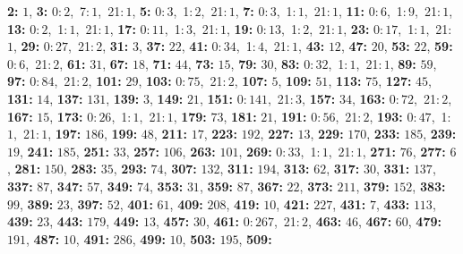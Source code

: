 \textsf{\bfseries 2:} $1$, \textsf{\bfseries 3:} 0:\,$2$,\ 7:\,$1$,\ 21:\,$1$, \textsf{\bfseries 5:} 0:\,$3$,\ 1:\,$2$,\ 21:\,$1$, \textsf{\bfseries 7:} 0:\,$3$,\ 1:\,$1$,\ 21:\,$1$, \textsf{\bfseries 11:} 0:\,$6$,\ 1:\,$9$,\ 21:\,$1$, \textsf{\bfseries 13:} 0:\,$2$,\ 1:\,$1$,\ 21:\,$1$, \textsf{\bfseries 17:} 0:\,$11$,\ 1:\,$3$,\ 21:\,$1$, \textsf{\bfseries 19:} 0:\,$13$,\ 1:\,$2$,\ 21:\,$1$, \textsf{\bfseries 23:} 0:\,$17$,\ 1:\,$1$,\ 21:\,$1$, \textsf{\bfseries 29:} 0:\,$27$,\ 21:\,$2$, \textsf{\bfseries 31:} $3$, \textsf{\bfseries 37:} $22$, \textsf{\bfseries 41:} 0:\,$34$,\ 1:\,$4$,\ 21:\,$1$, \textsf{\bfseries 43:} $12$, \textsf{\bfseries 47:} $20$, \textsf{\bfseries 53:} $22$, \textsf{\bfseries 59:} 0:\,$6$,\ 21:\,$2$, \textsf{\bfseries 61:} $31$, \textsf{\bfseries 67:} $18$, \textsf{\bfseries 71:} $44$, \textsf{\bfseries 73:} $15$, \textsf{\bfseries 79:} $30$, \textsf{\bfseries 83:} 0:\,$32$,\ 1:\,$1$,\ 21:\,$1$, \textsf{\bfseries 89:} $59$, \textsf{\bfseries 97:} 0:\,$84$,\ 21:\,$2$, \textsf{\bfseries 101:} $29$, \textsf{\bfseries 103:} 0:\,$75$,\ 21:\,$2$, \textsf{\bfseries 107:} $5$, \textsf{\bfseries 109:} $51$, \textsf{\bfseries 113:} $75$, \textsf{\bfseries 127:} $45$, \textsf{\bfseries 131:} $14$, \textsf{\bfseries 137:} $131$, \textsf{\bfseries 139:} $3$, \textsf{\bfseries 149:} $21$, \textsf{\bfseries 151:} 0:\,$141$,\ 21:\,$3$, \textsf{\bfseries 157:} $34$, \textsf{\bfseries 163:} 0:\,$72$,\ 21:\,$2$, \textsf{\bfseries 167:} $15$, \textsf{\bfseries 173:} 0:\,$26$,\ 1:\,$1$,\ 21:\,$1$, \textsf{\bfseries 179:} $73$, \textsf{\bfseries 181:} $21$, \textsf{\bfseries 191:} 0:\,$56$,\ 21:\,$2$, \textsf{\bfseries 193:} 0:\,$47$,\ 1:\,$1$,\ 21:\,$1$, \textsf{\bfseries 197:} $186$, \textsf{\bfseries 199:} $48$, \textsf{\bfseries 211:} $17$, \textsf{\bfseries 223:} $192$, \textsf{\bfseries 227:} $13$, \textsf{\bfseries 229:} $170$, \textsf{\bfseries 233:} $185$, \textsf{\bfseries 239:} $19$, \textsf{\bfseries 241:} $185$, \textsf{\bfseries 251:} $33$, \textsf{\bfseries 257:} $106$, \textsf{\bfseries 263:} $101$, \textsf{\bfseries 269:} 0:\,$33$,\ 1:\,$1$,\ 21:\,$1$, \textsf{\bfseries 271:} $76$, \textsf{\bfseries 277:} $6$, \textsf{\bfseries 281:} $150$, \textsf{\bfseries 283:} $35$, \textsf{\bfseries 293:} $74$, \textsf{\bfseries 307:} $132$, \textsf{\bfseries 311:} $194$, \textsf{\bfseries 313:} $62$, \textsf{\bfseries 317:} $30$, \textsf{\bfseries 331:} $137$, \textsf{\bfseries 337:} $87$, \textsf{\bfseries 347:} $57$, \textsf{\bfseries 349:} $74$, \textsf{\bfseries 353:} $31$, \textsf{\bfseries 359:} $87$, \textsf{\bfseries 367:} $22$, \textsf{\bfseries 373:} $211$, \textsf{\bfseries 379:} $152$, \textsf{\bfseries 383:} $99$, \textsf{\bfseries 389:} $23$, \textsf{\bfseries 397:} $52$, \textsf{\bfseries 401:} $61$, \textsf{\bfseries 409:} $208$, \textsf{\bfseries 419:} $10$, \textsf{\bfseries 421:} $227$, \textsf{\bfseries 431:} $7$, \textsf{\bfseries 433:} $113$, \textsf{\bfseries 439:} $23$, \textsf{\bfseries 443:} $179$, \textsf{\bfseries 449:} $13$, \textsf{\bfseries 457:} $30$, \textsf{\bfseries 461:} 0:\,$267$,\ 21:\,$2$, \textsf{\bfseries 463:} $46$, \textsf{\bfseries 467:} $60$, \textsf{\bfseries 479:} $191$, \textsf{\bfseries 487:} $10$, \textsf{\bfseries 491:} $286$, \textsf{\bfseries 499:} $10$, \textsf{\bfseries 503:} $195$, \textsf{\bfseries 509:} 